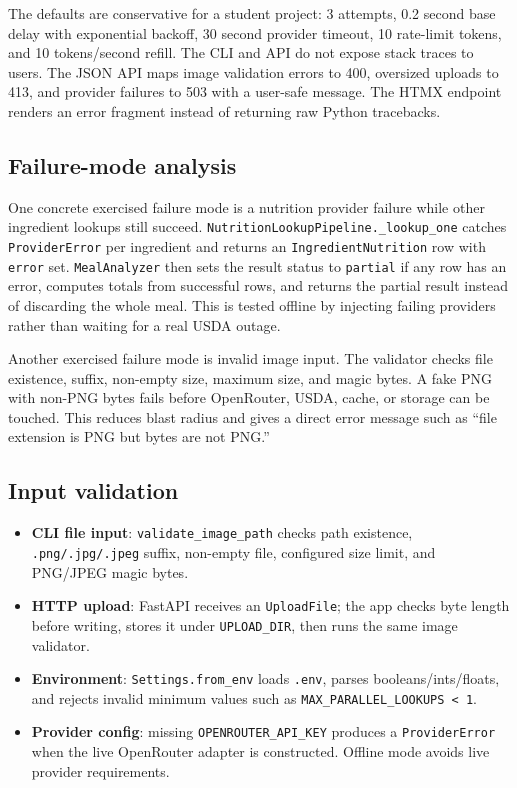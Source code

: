 \documentclass[11pt,a4paper]{article}
\begin{document}
The defaults are conservative for a student project: 3 attempts, 0.2 second base delay with exponential backoff, 30 second provider timeout, 10 rate-limit tokens, and 10 tokens/second refill. The CLI and API do not expose stack traces to users. The JSON API maps image validation errors to 400, oversized uploads to 413, and provider failures to 503 with a user-safe message. The HTMX endpoint renders an error fragment instead of returning raw Python tracebacks.

\subsection{Failure-mode analysis}
One concrete exercised failure mode is a nutrition provider failure while other ingredient lookups still succeed. \texttt{NutritionLookupPipeline.\_lookup\_one} catches \texttt{ProviderError} per ingredient and returns an \texttt{IngredientNutrition} row with \texttt{error} set. \texttt{MealAnalyzer} then sets the result status to \texttt{partial} if any row has an error, computes totals from successful rows, and returns the partial result instead of discarding the whole meal. This is tested offline by injecting failing providers rather than waiting for a real USDA outage.

Another exercised failure mode is invalid image input. The validator checks file existence, suffix, non-empty size, maximum size, and magic bytes. A fake PNG with non-PNG bytes fails before OpenRouter, USDA, cache, or storage can be touched. This reduces blast radius and gives a direct error message such as ``file extension is PNG but bytes are not PNG.''

\subsection{Input validation}
\begin{itemize}[itemsep=2pt]
  \item \textbf{CLI file input}: \texttt{validate\_image\_path} checks path existence, \texttt{.png/.jpg/.jpeg} suffix, non-empty file, configured size limit, and PNG/JPEG magic bytes.
  \item \textbf{HTTP upload}: FastAPI receives an \texttt{UploadFile}; the app checks byte length before writing, stores it under \texttt{UPLOAD\_DIR}, then runs the same image validator.
  \item \textbf{Environment}: \texttt{Settings.from\_env} loads \texttt{.env}, parses booleans/ints/floats, and rejects invalid minimum values such as \texttt{MAX\_PARALLEL\_LOOKUPS < 1}.
  \item \textbf{Provider config}: missing \texttt{OPENROUTER\_API\_KEY} produces a \texttt{ProviderError} when the live OpenRouter adapter is constructed. Offline mode avoids live provider requirements.
\end{itemize}
\end{document}
